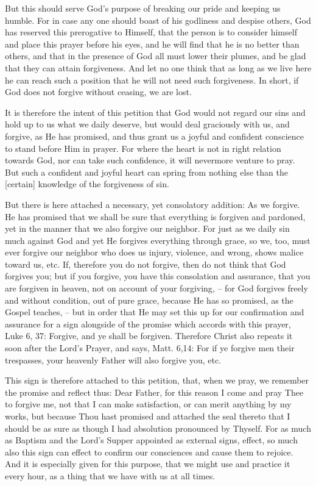 But this should serve God's purpose of breaking our pride and keeping
us humble. For in case any one should boast of his godliness and
despise others, God has reserved this prerogative to Himself, that the
person is to consider himself and place this prayer before his eyes,
and he will find that he is no better than others, and that in the
presence of God all must lower their plumes, and be glad that they can
attain forgiveness. And let no one think that as long as we live here
he can reach such a position that he will not need such forgiveness. In
short, if God does not forgive without ceasing, we are lost.

It is therefore the intent of this petition that God would not regard
our sins and hold up to us what we daily deserve, but would deal
graciously with us, and forgive, as He has promised, and thus grant us
a joyful and confident conscience to stand before Him in prayer. For
where the heart is not in right relation towards God, nor can take such
confidence, it will nevermore venture to pray. But such a confident and
joyful heart can spring from nothing else than the [certain] knowledge
of the forgiveness of sin.

But there is here attached a necessary, yet consolatory addition: As we
forgive. He has promised that we shall be sure that everything is
forgiven and pardoned, yet in the manner that we also forgive our
neighbor. For just as we daily sin much against God and yet He forgives
everything through grace, so we, too, must ever forgive our neighbor
who does us injury, violence, and wrong, shows malice toward us, etc.
If, therefore you do not forgive, then do not think that God forgives
you; but if you forgive, you have this consolation and assurance, that
you are forgiven in heaven, not on account of your forgiving, -- for
God forgives freely and without condition, out of pure grace, because
He has so promised, as the Gospel teaches, -- but in order that He may
set this up for our confirmation and assurance for a sign alongside of
the promise which accords with this prayer, Luke 6, 37: Forgive, and ye
shall be forgiven. Therefore Christ also repeats it soon after the
Lord's Prayer, and says, Matt. 6,14: For if ye forgive men their
trespasses, your heavenly Father will also forgive you, etc.

This sign is therefore attached to this petition, that, when we pray,
we remember the promise and reflect thus: Dear Father, for this reason
I come and pray Thee to forgive me, not that I can make satisfaction,
or can merit anything by my works, but because Thou hast promised and
attached the seal thereto that I should be as sure as though I had
absolution pronounced by Thyself. For as much as Baptism and the Lord's
Supper appointed as external signs, effect, so much also this sign can
effect to confirm our consciences and cause them to rejoice. And it is
especially given for this purpose, that we might use and practice it
every hour, as a thing that we have with us at all times.


